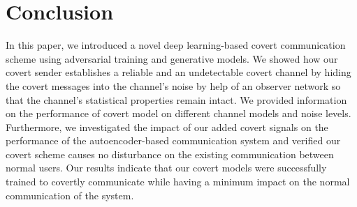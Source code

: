 \section{Conclusion}
\label{s:conc}
In this paper, we introduced a novel deep learning-based covert communication scheme using adversarial training and generative models. We showed how our covert sender establishes a reliable and an undetectable covert channel by hiding the covert messages into the channel's noise by help of an observer network so that the channel's statistical properties remain intact. We provided information on the performance of covert model on different channel models and noise levels. Furthermore, we investigated the impact of our added covert signals on the performance of the autoencoder-based communication system and verified our covert scheme causes no disturbance on the existing communication between normal users. Our results indicate that our covert models were successfully trained to covertly communicate while having a minimum impact on the normal communication of the system.